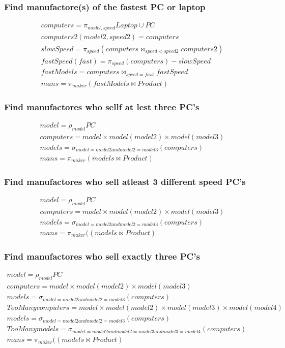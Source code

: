 \documentclass[12pt, a4paper]{article}
\begin{document}
				\subsubsection{Find manufactore(s) of the fastest PC or laptop}
					\begin{align*}
						computers = \pi_{model,speed}Laptop \cup PC\\
						computers2(model2, speed2) = computers\\
						slowSpeed = \pi_{speed}(computers\bowtie_{speed<speed2} computers2)\\
						fastSpeed(fast) = \pi_{speed}(computers)-slowSpeed\\
						fastModels = computers \bowtie_{speed=fast} fastSpeed\\
						mans = \pi_{maker}(fastModels \bowtie Product)
 					\end{align*}	
				\subsubsection{Find manufactores who sellf at lest three PC's}
					\begin{align*}
						model = \rho_{model}PC\\
						computers = model \times model(model2) \times model(model3)\\
						models = \sigma_{model = model2 and model2 = model3}(computers)\\
						mans = \pi_{maker}(models \bowtie Product)
 					\end{align*}		
				\subsubsection{Find manufactores who sell atleast 3 different speed PC's}
					\begin{align*}
						model = \rho_{model}PC\\
						computers = model \times model(model2) \times model(model3)\\
						models = \sigma_{model = model2 and model2 = model3}(computers)\\
						mans = \pi_{maker}((models \bowtie Product)
 					\end{align*}	
				\subsubsection{Find manufactores who sell exactly three PC's}
					\begin{align*}
						model = \rho_{model}PC\\
						computers = model \times model(model2) \times model(model3)\\
						models = \sigma_{model = model2 and model2 = model3}(computers)\\
						TooManycomputers = model \times model(model2) \times model(model3) \times model(model4)\\
						models = \sigma_{model = model2 and model2 = model3}(computers)\\
						TooManymodels = \sigma_{model = model2 and model2 = model3 and model3 = model4}(computers)\\
						mans = \pi_{maker}((models \bowtie Product)
 					\end{align*}											
			\clearpage
\end{document}
